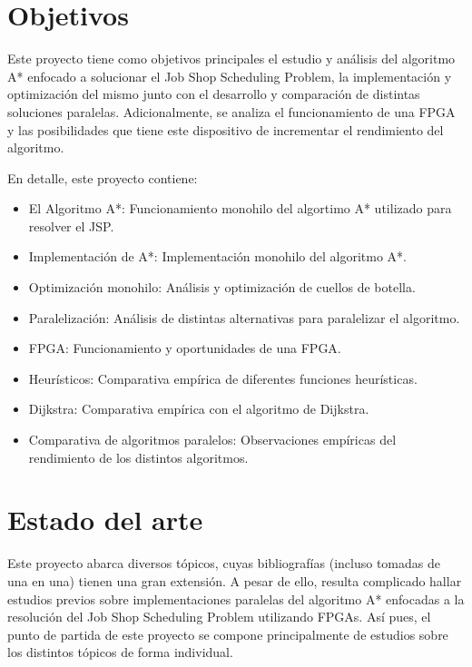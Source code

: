 
\section{Objetivos}

Este proyecto tiene como objetivos principales el estudio y análisis
del algoritmo A* enfocado a solucionar el Job Shop Scheduling Problem,
la implementación y optimización del mismo junto con el desarrollo y
comparación de distintas soluciones paralelas.
Adicionalmente, se analiza el funcionamiento de una FPGA y
las posibilidades que tiene este dispositivo de incrementar
el rendimiento del algoritmo.

En detalle, este proyecto contiene:
\begin{itemize}[itemsep=0.25px]
    \item El Algoritmo A*: Funcionamiento monohilo del algortimo A* utilizado para resolver el JSP.
    \item Implementación de A*: Implementación monohilo del algoritmo A*.
    \item Optimización monohilo: Análisis y optimización de cuellos de botella.
    \item Paralelización: Análisis de distintas alternativas para paralelizar el algoritmo.
    \item FPGA: Funcionamiento y oportunidades de una FPGA.
    \item Heurísticos: Comparativa empírica de diferentes funciones heurísticas.
    \item Dijkstra: Comparativa empírica con el algoritmo de Dijkstra.
    \item Comparativa de algoritmos paralelos: Observaciones empíricas del rendimiento de los distintos algoritmos.
\end{itemize}

\pagebreak

\section{Estado del arte}

Este proyecto abarca diversos tópicos, cuyas bibliografías
(incluso tomadas de una en una) tienen una gran extensión.
A pesar de ello, resulta complicado hallar estudios previos sobre implementaciones
paralelas del algoritmo A* enfocadas a la resolución del Job Shop Scheduling Problem
utilizando FPGAs.
Así pues, el punto de partida de este proyecto
se compone principalmente de estudios
sobre los distintos tópicos de forma individual.

